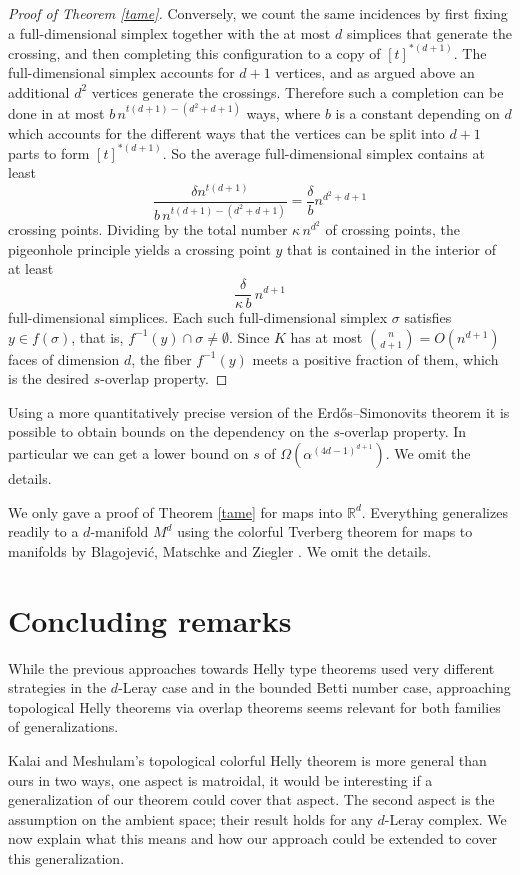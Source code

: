 \documentclass[12pt,a4paper,oneside]{amsart}\sloppy
\theoremstyle{definition}
\newcommand{\inv}[1]{#1^{-1}}
\begin{document}
\begin{proof}[Proof of Theorem \ref{tame}]
Conversely, we count the same incidences by first fixing a full-dimensional simplex together with the at most $d$ simplices that generate the crossing, and then completing this configuration to a copy of $[t]^{*(d+1)}$. The full-dimensional simplex accounts for $d+1$ vertices, and as argued above an additional $d^2$ vertices generate the crossings. Therefore such a completion can be done in at most $b\, n^{t(d+1)-(d^2+d+1)}$ ways, where $b$ is a constant depending on $d$ which accounts for the different ways that the vertices can be split into $d+1$ parts to form $[t]^{*(d+1)}$.
So the average full-dimensional simplex contains at least
\[\frac{\delta n^{t(d+1)}}{b\, n^{t(d+1)-(d^2+d+1)}}=\frac{\delta}{b}  n^{d^2+d+1}\]
crossing points. Dividing by the total number $\kappa\,n^{d^2}$ of crossing points, the pigeonhole principle yields a crossing point $y$ that is contained in the interior of at least 
\[\frac{\delta}{ \kappa\, b}\, n^{d+1}\]
full-dimensional simplices. Each such full-dimensional simplex $\sigma$ satisfies $y \in f(\sigma)$, that is, $\inv{f}(y)\cap \sigma \neq \emptyset$. Since $K$ has at most $\binom{n}{d+1} = O(n^{d+1})$ faces of dimension $d$, the fiber $\inv{f}(y)$ meets a positive fraction of them, which is the desired $s$-overlap property. 
\end{proof}


Using a more quantitatively precise version of the Erd{\H o}s--Simonovits theorem it is possible to obtain bounds on the dependency on the $s$-overlap property. In particular we can get a lower bound on $s$ of $\Omega\!\left(\alpha^{(4d-1)^{d+1}}\right)$. We omit the details.

We only gave a proof of Theorem \ref{tame} for maps into $\mathbb{R}^d$. Everything generalizes readily to a $d$-manifold $M^d$ using the colorful Tverberg theorem for maps to manifolds by Blagojevi\'c, Matschke and Ziegler \cite{BlagojevicMatschkeZiegler2011}. We omit the details. 



\section{Concluding remarks}
While the previous approaches towards Helly type theorems used very different strategies in the $d$-Leray case and in the bounded Betti number case, approaching topological Helly theorems via overlap theorems seems relevant for both families of generalizations.

Kalai and Meshulam's topological colorful Helly theorem is more general than ours in two ways, one aspect is matroidal, it would be interesting if a generalization of our theorem could cover that aspect. The second aspect is the assumption on the ambient space; their result holds for any $d$-Leray complex. We now explain what this means and how our approach could be extended to cover this generalization.
\end{document}
